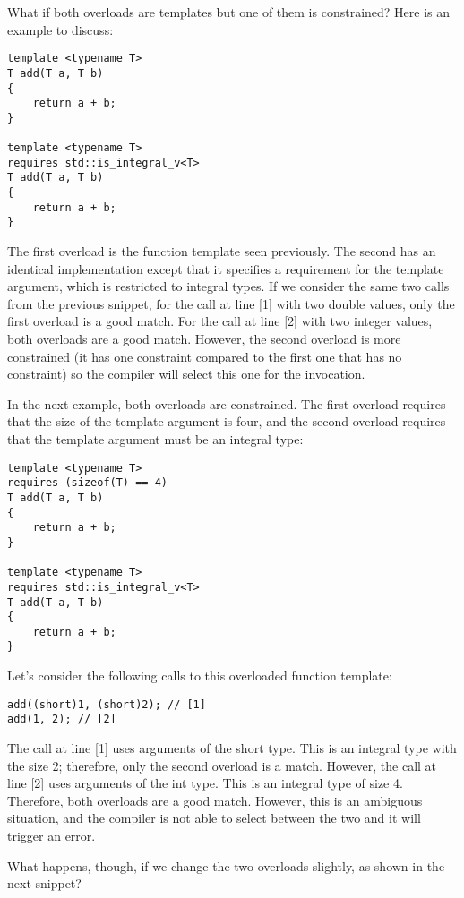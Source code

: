What if both overloads are templates but one of them is constrained? Here is an example to discuss:

\begin{lstlisting}[style=styleCXX]
template <typename T>
T add(T a, T b)
{
	return a + b;
}

template <typename T>
requires std::is_integral_v<T>
T add(T a, T b)
{
	return a + b;
}
\end{lstlisting}

The first overload is the function template seen previously. The second has an identical implementation except that it specifies a requirement for the template argument, which is restricted to integral types. If we consider the same two calls from the previous snippet, for the call at line [1] with two double values, only the first overload is a good match. For the call at line [2] with two integer values, both overloads are a good match. However, the second overload is more constrained (it has one constraint compared to the first one that has no constraint) so the compiler will select this one for the invocation.

In the next example, both overloads are constrained. The first overload requires that the size of the template argument is four, and the second overload requires that the template argument must be an integral type:

\begin{lstlisting}[style=styleCXX]
template <typename T>
requires (sizeof(T) == 4)
T add(T a, T b)
{
	return a + b;
}

template <typename T>
requires std::is_integral_v<T>
T add(T a, T b)
{
	return a + b;
}
\end{lstlisting}

Let’s consider the following calls to this overloaded function template:

\begin{lstlisting}[style=styleCXX]
add((short)1, (short)2); // [1]
add(1, 2); // [2]
\end{lstlisting}

The call at line [1] uses arguments of the short type. This is an integral type with the size 2; therefore, only the second overload is a match. However, the call at line [2] uses arguments of the int type. This is an integral type of size 4. Therefore, both overloads are a good match. However, this is an ambiguous situation, and the compiler is not able to select between the two and it will trigger an error.

What happens, though, if we change the two overloads slightly, as shown in the next snippet?

